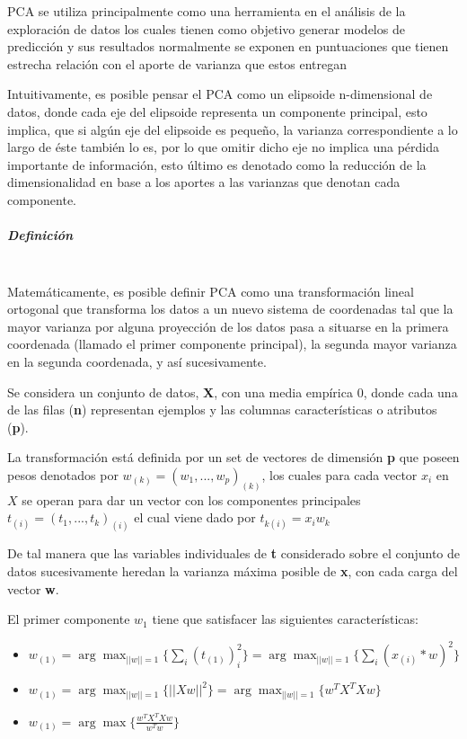 PCA se utiliza principalmente como una herramienta en el análisis de la exploración de datos los cuales tienen como objetivo generar modelos de predicción y sus resultados normalmente se exponen en puntuaciones que tienen estrecha relación con el aporte de varianza que estos entregan  

Intuitivamente, es posible pensar el PCA como un elipsoide n-dimensional de datos, donde cada eje del elipsoide representa un componente principal, esto implica, que si algún eje del elipsoide es pequeño, la varianza correspondiente a lo largo de éste también lo es, por lo que omitir dicho eje no implica una pérdida importante de información, esto último es denotado como la reducción de la dimensionalidad en base a los aportes a las varianzas que denotan cada componente.

\subparagraph{Definición\\\\}

Matemáticamente, es posible definir PCA como una transformación lineal ortogonal que transforma los datos a un nuevo sistema de coordenadas tal que la mayor varianza por alguna proyección de los datos pasa a situarse en la primera coordenada (llamado el primer componente principal), la segunda mayor varianza en la segunda coordenada, y así sucesivamente.

Se considera un conjunto de datos, \textbf{X}, con una media empírica 0, donde cada una de las filas (\textbf{n}) representan ejemplos y las columnas características o atributos (\textbf{p}).

La transformación está definida por un set de vectores de dimensión \textbf{p} que poseen pesos denotados por $ w_{(k)} = (w_{1},...,w_{p})_{(k)}$, los cuales para cada vector $x_{i}$ en $X$ se operan para dar un vector con los componentes principales $ t_{(i)} = (t_{1},...,t_{k})_{(i)}$ el cual viene dado por $ t_{k(i)} = x_{i}  w_{k}$

De tal manera que las variables individuales de \textbf{t} considerado sobre el conjunto de datos sucesivamente heredan la varianza máxima posible de \textbf{x}, con cada carga del vector \textbf{w}.

El primer componente $ w_{{1}} $ tiene que satisfacer las siguientes características:

\begin{itemize}
	
	\item $w_{(1)} = \arg \max_{||w||=1} \{\sum_{i}(t_{(1)})^{2}_{i}\} = \arg \max_{||w||=1} \{\sum_{i}(x_{(i)}*w)^{2}\}$
	
	\item $w_{(1)} = \arg \max_{||w||=1} \{||Xw||^{2}\} = \arg \max_{||w||=1} \{w^{T}X^{T}Xw\}$
	
	\item $w_{(1)} = \arg \max \{\frac{w^{T}X^{T}Xw}{w^{T}w}\}$
	
\end{itemize}

